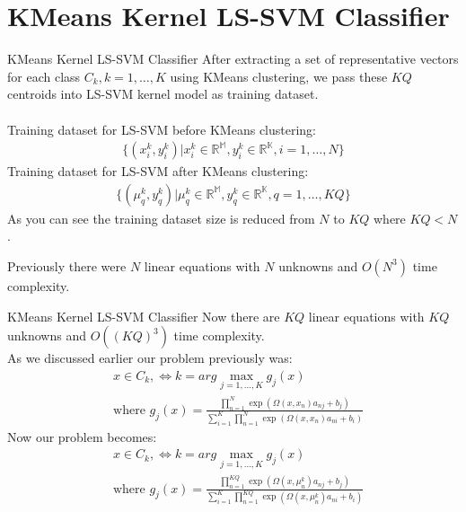 \documentclass{beamer}
\begin{document}
    \section{KMeans Kernel LS-SVM Classifier}
    \begin{frame}{KMeans Kernel LS-SVM Classifier}
        \quad After extracting a set of representative vectors for each class
        $C_{k}, k=1,\ldots,K$ using KMeans clustering,
        we pass these $KQ$ centroids into LS-SVM kernel model as training dataset. \\
        \quad \\
        \quad Training dataset for LS-SVM before KMeans clustering:
        \begin{align*}
            \{(x_{i}^{k},y_{i}^{k})| x_{i}^{k} \in \mathbb{R^{M}},y_{i}^{k} \in \mathbb{R^{K}}, i=1,\ldots,N\}
        \end{align*}
        \quad Training dataset for LS-SVM after KMeans clustering:
        \begin{align*}
            \{(\mu_{q}^{k},y_{q}^{k})| \mu_{q}^{k} \in \mathbb{R^{M}},y_{q}^{k} \in \mathbb{R^{K}}, q=1,\ldots,KQ\}
        \end{align*}
        \quad As you can see the training dataset size is reduced from $N$ to $KQ$ where \quad $KQ<N$.

        \quad Previously there were $N$ linear equations with $N$ unknowns and $O(N^3)$ time complexity.
    \end{frame}
    \begin{frame}{KMeans Kernel LS-SVM Classifier}
        Now there are $KQ$ linear equations with $KQ$ unknowns and $O((KQ)^3)$ time complexity. \\
        As we discussed earlier our problem previously was:
        \begin{align*}
            & x \in C_{k}, \Leftrightarrow k= arg \max_{j=1,\ldots,K} g_{j}(x) \\
            & \text{where } g_{j}(x) = \frac{\prod_{n=1}^{N}\exp(\Omega(x,x_{n})a_{nj} + b_{j})}{\sum_{i=1}^{K} \prod_{n=1}^{N}\exp(\Omega(x,x_{n})a_{ni} + b_{i})}
        \end{align*}
        Now our problem becomes:
        \begin{align*}
            & x \in C_{k}, \Leftrightarrow k= arg \max_{j=1,\ldots,K} g_{j}(x) \\
            & \text{where } g_{j}(x) = \frac{\prod_{n=1}^{KQ}\exp(\Omega(x,\mu_{n}^{k})a_{nj} + b_{j})}{\sum_{i=1}^{K} \prod_{n=1}^{KQ}\exp(\Omega(x,\mu_{n}^{k})a_{ni} + b_{i})}
        \end{align*}
    \end{frame}
\end{document}
